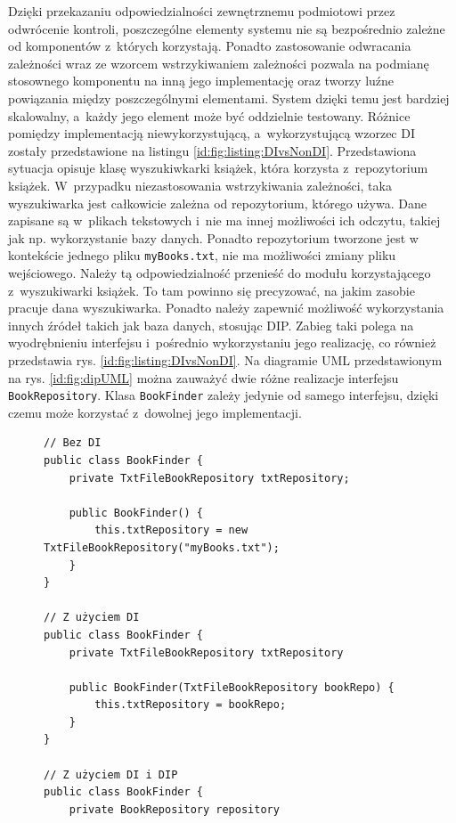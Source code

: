 \documentclass[a4paper]{book}
\begin{document}
{Dzięki przekazaniu odpowiedzialności zewnętrznemu podmiotowi przez odwrócenie kontroli, poszczególne elementy systemu nie są bezpośrednio zależne od komponentów z~których korzystają. Ponadto zastosowanie odwracania zależności wraz ze wzorcem wstrzykiwaniem zależności pozwala na podmianę stosownego komponentu na inną jego implementację oraz tworzy luźne powiązania między poszczególnymi elementami. System dzięki temu jest bardziej skalowalny, a~każdy jego element może być oddzielnie testowany. Różnice pomiędzy implementacją niewykorzystującą, a~wykorzystującą wzorzec DI zostały przedstawione na listingu \ref{id:fig:listing:DIvsNonDI}. Przedstawiona sytuacja opisuje klasę wyszukiwkarki książek, która korzysta z~repozytorium książek. W~przypadku niezastosowania wstrzykiwania zależności, taka wyszukiwarka jest całkowicie zależna od repozytorium, którego używa. Dane zapisane są w~plikach tekstowych i~nie ma innej możliwości ich odczytu, takiej jak np. wykorzystanie bazy danych. Ponadto repozytorium tworzone jest w kontekście jednego pliku \lstinline|myBooks.txt|, nie ma możliwości zmiany pliku wejściowego. Należy tą odpowiedzialność przenieść do modułu korzystającego z~wyszukiwarki książek. To tam powinno się precyzować, na jakim zasobie pracuje dana wyszukiwarka. Ponadto należy zapewnić możliwość wykorzystania innych źródeł takich jak baza danych, stosując DIP. Zabieg taki polega na wyodrębnieniu interfejsu i~pośrednio wykorzystaniu jego realizację, co również przedstawia rys. \ref{id:fig:listing:DIvsNonDI}. Na diagramie UML przedstawionym na rys. \ref{id:fig:dipUML} można zauważyć dwie różne realizacje interfejsu \lstinline|BookRepository|. Klasa \lstinline|BookFinder| zależy jedynie od samego interfejsu, dzięki czemu może korzystać z~dowolnej jego implementacji.
\begin{figure}
\begin{lstlisting}
// Bez DI
public class BookFinder {
	private TxtFileBookRepository txtRepository;
	
	public BookFinder() {
		this.txtRepository = new TxtFileBookRepository("myBooks.txt");
	}
}

// Z użyciem DI
public class BookFinder {
	private TxtFileBookRepository txtRepository
	
	public BookFinder(TxtFileBookRepository bookRepo) {
		this.txtRepository = bookRepo;
	}
}

// Z użyciem DI i DIP
public class BookFinder {
	private BookRepository repository
	

\end{lstlisting}
\end{figure}}
\end{document}
